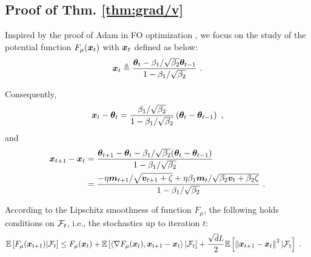 \begin{appendices}
\subsection{Proof of Thm. \ref{thm:grad/v}}\label{proof:grad/v}
Inspired by the proof of Adam \citep{adam} in FO optimization \citep{wang2024closing, zhang2024convergence}, we focus on the study of the potential function $F_{\mu}({\bm{x}}_t)$ with ${\bm{x}}_t$ defined as below:
\begin{equation}
\vx_t \triangleq \frac{\vtheta_t - \beta_1/\sqrt{\beta_2}\vtheta_{t-1}}{1- \beta_1/\sqrt{\beta_2}} \ .
\end{equation}

Consequently,
\begin{equation}
\begin{aligned}
{\bm{x}}_t - {\bm{\theta}}_t = \frac{\beta_1/\sqrt{\beta_2}}{1-\beta_1/\sqrt{\beta_2}}\left({\bm{\theta}}_t - {\bm{\theta}}_{t-1}\right) \ , \label{eq:vjenf}
\end{aligned}
\end{equation}
and
\begin{equation}
\begin{aligned}
{\bm{x}}_{t+1} -{\bm{x}}_{t} &= \frac{{\bm{\theta}}_{t+1} - {\bm{\theta}}_{t} - \beta_1/\sqrt{\beta_2}({\bm{\theta}}_{t} - {\bm{\theta}}_{t-1})}{1-\beta_1/\sqrt{\beta_2}} \\
&= \frac{- \eta{\bm{m}}_{t+1}/\sqrt{{\bm{v}}_{t+1} + \zeta} + \eta\beta_1{\bm{m}}_{t} / \sqrt{\beta_2{\bm{v}}_{t} + \beta_2\zeta}}{1-\beta_1/\sqrt{\beta_2}} \ . \label{eq:vveb}
\end{aligned}
\end{equation}

According to the Lipschitz smoothness of function $F_{\mu}$, the following holds conditions on ${\mathcal{F}}_t$, i.e., the stochastics up to iteration $t$:
\begin{equation}\label{eq:xvdsvd}
\begin{aligned}
\mathbb{E}\left[F_{\mu}({\bm{x}}_{t+1})|{\mathcal{F}}_t\right] &\leq F_{\mu}({\bm{x}}_t) + \mathbb{E}\left[\left\langle\nabla F_{\mu}({\bm{x}}_t), {\bm{x}}_{t+1} - {\bm{x}}_{t}\right\rangle | {\mathcal{F}}_t\right] + \frac{\sqrt{d}L}{2}\mathbb{E}\left[\left\|{\bm{x}}_{t+1} - {\bm{x}}_{t}\right\|^2 | {\mathcal{F}}_t\right] \ .
\end{aligned}
\end{equation}


\end{appendices}
